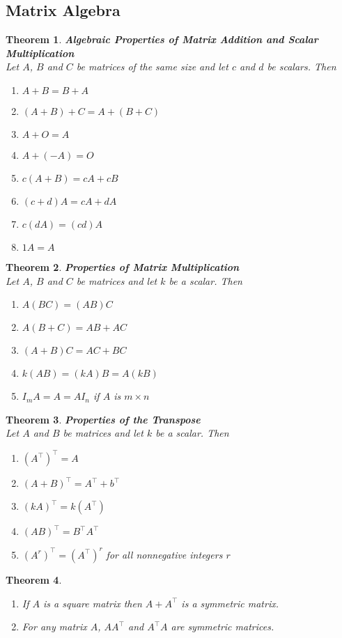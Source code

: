 \documentclass{article}
\theoremstyle{sltheorem}
\newtheorem{theorem}{Theorem}[section]
\begin{document}
\subsection{Matrix Algebra}
\begin{theorem}
    \textbf{Algebraic Properties of Matrix Addition and Scalar Multiplication}\\
    Let $A$, $B$ and $C$ be matrices of the same size and let $c$ and $d$ be scalars. Then
    \begin{enumerate}
        \item $A+B=B+A$
        \item $(A+B)+C=A+(B+C)$
        \item $A+O=A$
        \item $A+(-A)=O$
        \item $c(A+B)=cA + cB$
        \item $(c+d)A = cA+dA$
        \item $c(dA) = (cd)A$
        \item $1A=A$
    \end{enumerate}
\end{theorem}
\begin{theorem}
    \textbf{Properties of Matrix Multiplication}\\
    Let $A$, $B$ and $C$ be matrices and let $k$ be a scalar. Then
    \begin{enumerate}
        \item $A(BC) = (AB)C$
        \item $A(B+C) = AB + AC$
        \item $(A + B)C = AC + BC$
        \item $k(AB) = (kA)B = A(kB)$
        \item $I_mA=A=AI_n$ if $A$ is $m\times n$
    \end{enumerate}
\end{theorem}
\begin{theorem}
    \textbf{Properties of the Transpose}\\
    Let $A$ and $B$ be matrices and let $k$ be a scalar. Then
    \begin{enumerate}
        \item $(A^\intercal)^\intercal = A$
        \item $(A+B)^\intercal = A^\intercal + b^\intercal$
        \item $(kA)^\intercal = k(A^\intercal)$
        \item $(AB)^\intercal = B^\intercal A^\intercal$
        \item $(A^r)^\intercal = (A^\intercal)^r$ for all nonnegative integers $r$
    \end{enumerate}
\end{theorem}
\begin{theorem}
    \begin{enumerate}
        \item If $A$ is a square matrix then $A+A^\intercal$ is a symmetric matrix.
        \item For any matrix $A$, $AA^\intercal$ and $A^\intercal A$ are symmetric matrices.
    \end{enumerate}
\end{theorem}
\end{document}
